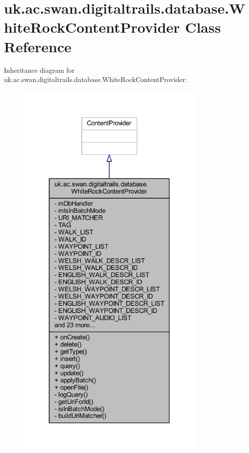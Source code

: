 \hypertarget{classuk_1_1ac_1_1swan_1_1digitaltrails_1_1database_1_1_white_rock_content_provider}{\section{uk.\+ac.\+swan.\+digitaltrails.\+database.\+White\+Rock\+Content\+Provider Class Reference}
\label{classuk_1_1ac_1_1swan_1_1digitaltrails_1_1database_1_1_white_rock_content_provider}
}


Inheritance diagram for uk.\+ac.\+swan.\+digitaltrails.\+database.\+White\+Rock\+Content\+Provider\+:
\nopagebreak
\begin{figure}[H]
\begin{center}
\leavevmode
\includegraphics[height=550pt]{classuk_1_1ac_1_1swan_1_1digitaltrails_1_1database_1_1_white_rock_content_provider__inherit__graph}
\end{center}
\end{figure}


